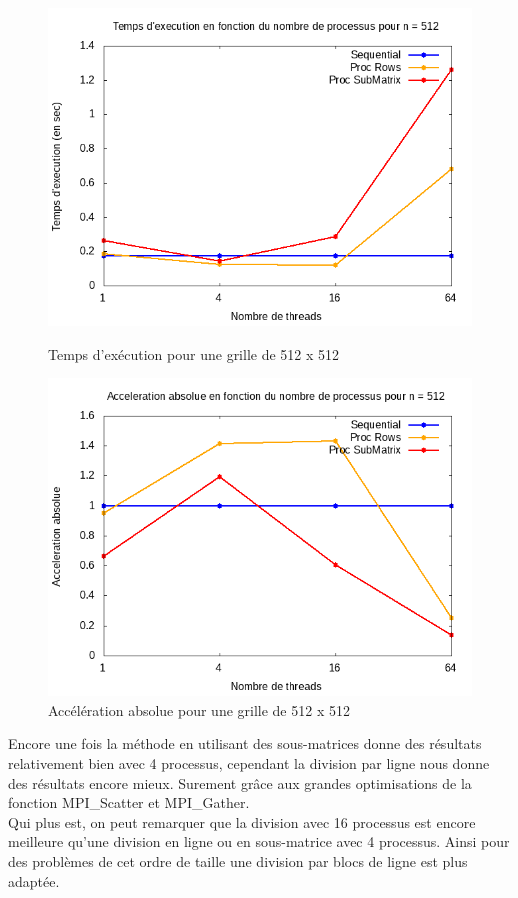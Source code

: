 \documentclass[10pt,a4paper]{article}
\begin{document}
\begin{figure}[h]
  \centering
  \begin{minipage}[b]{0.49\textwidth}
	\includegraphics[width=\textwidth]{./Time/size_512_time.png}
    \caption{Temps d'exécution pour une grille de 512 x 512}
  \end{minipage}
  \hfill
  \begin{minipage}[b]{0.49\textwidth}
    \includegraphics[width=\textwidth]{./Time/size_512_acceleration.png}
    \caption{Accélération absolue pour une grille de 512 x 512}
  \end{minipage}
\end{figure}
Encore une fois la méthode en utilisant des sous-matrices donne des résultats relativement bien avec 4 processus, cependant la division par ligne nous donne des résultats encore mieux. Surement grâce aux grandes optimisations de la fonction MPI\_Scatter et MPI\_Gather. \\
Qui plus est, on peut remarquer que la division avec 16 processus est encore meilleure qu'une division en ligne ou en sous-matrice avec 4 processus. Ainsi pour des problèmes de cet ordre de taille une division par blocs de ligne est plus adaptée.
\end{document}

